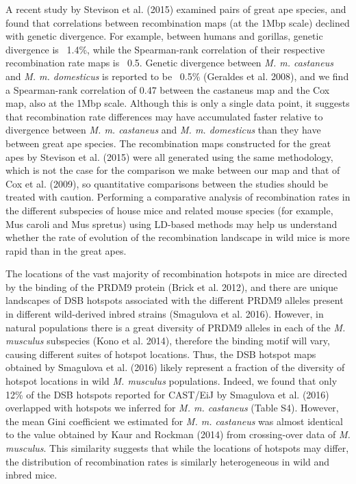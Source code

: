 A recent study by Stevison et al. (2015) examined pairs of great ape species, and found that correlations between recombination maps (at the 1Mbp scale) declined with genetic divergence. For example, between humans and gorillas, genetic divergence is ~1.4\%, while the Spearman-rank correlation of their respective recombination rate maps is ~0.5. Genetic divergence between \textit{M. m. castaneus} and \textit{M. m. domesticus} is reported to be ~0.5\% (Geraldes et al. 2008), and we find a Spearman-rank correlation of 0.47 between the castaneus map and the Cox map, also at the 1Mbp scale. Although this is only a single data point, it suggests that recombination rate differences may have accumulated faster relative to divergence between \textit{M. m. castaneus} and \textit{M. m. domesticus} than they have between great ape species. The recombination maps constructed for the great apes by Stevison et al. (2015)  were all generated using the same methodology, which is not the case for the comparison we make between our map and that of Cox et al. (2009), so quantitative comparisons between the studies should be treated with caution. Performing a comparative analysis of recombination rates in the different subspecies of house mice and related mouse species (for example, Mus caroli and Mus spretus) using LD-based methods may help us understand whether the rate of evolution of the recombination landscape in wild mice is more rapid than in the great apes.

The locations of the vast majority of recombination hotspots in mice are directed by the binding of the PRDM9 protein (Brick et al. 2012), and there are unique landscapes of DSB hotspots associated with the different PRDM9 alleles present in different wild-derived inbred strains (Smagulova et al. 2016). However, in natural populations there is a great diversity of PRDM9 alleles in each of the \textit{M. musculus} subspecies (Kono et al. 2014), therefore the binding motif will vary, causing different suites of hotspot locations. Thus, the DSB hotspot maps obtained by Smagulova et al. (2016) likely represent a fraction of the diversity of hotspot locations in wild \textit{M. musculus} populations. Indeed, we found that only 12\% of the DSB hotspots reported for CAST/EiJ by Smagulova et al. (2016) overlapped with hotspots we inferred for \textit{M. m. castaneus} (Table S4). However, the mean Gini coefficient we estimated for \textit{M. m. castaneus} was almost identical to the value obtained by Kaur and Rockman (2014) from crossing-over data of \textit{M. musculus}. This similarity suggests that while the locations of hotspots may differ, the distribution of recombination rates is similarly heterogeneous in wild and inbred mice.

